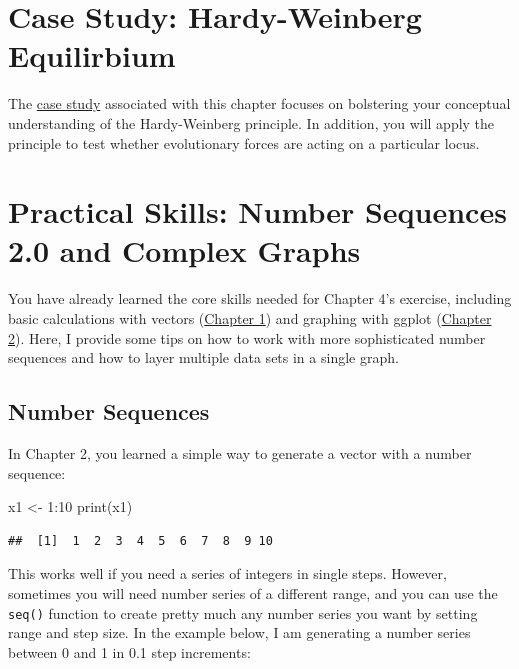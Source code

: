 \documentclass[
]{book}
\newenvironment{Shaded}{\begin{snugshade}}{\end{snugshade}}
\newcommand{\DecValTok}[1]{\textcolor[rgb]{0.00,0.00,0.81}{#1}}
\newcommand{\FunctionTok}[1]{\textcolor[rgb]{0.00,0.00,0.00}{#1}}
\newcommand{\NormalTok}[1]{#1}
\newcommand{\OtherTok}[1]{\textcolor[rgb]{0.56,0.35,0.01}{#1}}
\newcommand{\SpecialCharTok}[1]{\textcolor[rgb]{0.00,0.00,0.00}{#1}}
\begin{document}
\hypertarget{case-study-hardy-weinberg-equilirbium}{%
\section{Case Study: Hardy-Weinberg Equilirbium}\label{case-study-hardy-weinberg-equilirbium}}

The \href{exercises/BIOL520-ex3.zip}{case study} associated with this chapter focuses on bolstering your conceptual understanding of the Hardy-Weinberg principle. In addition, you will apply the principle to test whether evolutionary forces are acting on a particular locus.

\hypertarget{practical-skills-number-sequences-2.0-and-complex-graphs}{%
\section{Practical Skills: Number Sequences 2.0 and Complex Graphs}\label{practical-skills-number-sequences-2.0-and-complex-graphs}}

You have already learned the core skills needed for Chapter 4's exercise, including basic calculations with vectors (\href{what-evolution-is.html\#practical-skills-getting-started-with-r}{Chapter 1}) and graphing with ggplot (\href{evidence-for-evolution.html\#practical-skills}{Chapter 2}). Here, I provide some tips on how to work with more sophisticated number sequences and how to layer multiple data sets in a single graph.

\hypertarget{number-sequences-1}{%
\subsection{Number Sequences}\label{number-sequences-1}}

In Chapter 2, you learned a simple way to generate a vector with a number sequence:

\begin{Shaded}
\begin{Highlighting}[]
\NormalTok{x1 }\OtherTok{\textless{}{-}} \DecValTok{1}\SpecialCharTok{:}\DecValTok{10}
\FunctionTok{print}\NormalTok{(x1)}
\end{Highlighting}
\end{Shaded}

\begin{verbatim}
##  [1]  1  2  3  4  5  6  7  8  9 10
\end{verbatim}

This works well if you need a series of integers in single steps. However, sometimes you will need number series of a different range, and you can use the \texttt{seq()} function to create pretty much any number series you want by setting range and step size. In the example below, I am generating a number series between 0 and 1 in 0.1 step increments:
\end{document}
